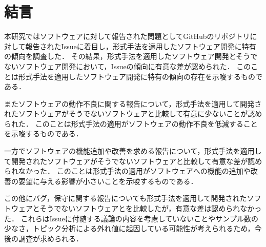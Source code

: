 \documentclass[main]{subfiles}
\begin{document}
\chapter{結言}

本研究ではソフトウェアに対して報告された問題としてGitHubのリポジトリに対して報告されたIssueに着目し，形式手法を適用したソフトウェア開発に特有の傾向を調査した．
その結果，形式手法を適用したソフトウェア開発とそうでないソフトウェア開発において，Issueの傾向に有意な差が認められた．
このことは形式手法を適用したソフトウェア開発に特有の傾向の存在を示唆するものである．

またソフトウェアの動作不良に関する報告について，形式手法を適用して開発されたソフトウェアがそうでないソフトウェアと比較して有意に少ないことが認められた．
このことは形式手法の適用がソフトウェアの動作不良を低減することを示唆するものである．

一方でソフトウェアの機能追加や改善を求める報告について，形式手法を適用して開発されたソフトウェアがそうでないソフトウェアと比較して有意な差が認められなかった．
このことは形式手法の適用がソフトウェアへの機能の追加や改善の要望に与える影響が小さいことを示唆するものである．

この他にバグ，保守に関する報告についても形式手法を適用して開発されたソフトウェアとそうでないソフトウェアとを比較したが，有意な差は認められなかった．
これらはIssueに付随する議論の内容を考慮していないことやサンプル数の少なさ，トピック分析による外れ値に起因している可能性が考えられるため，今後の調査が求められる．
\end{document}
